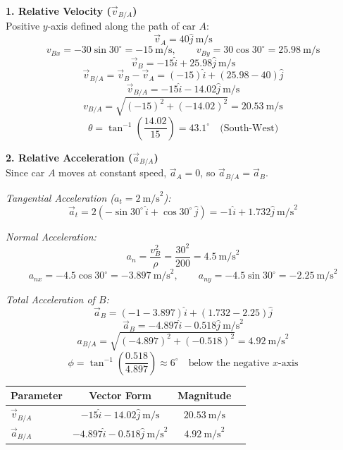 \documentclass[12pt,a3paper]{article}
\begin{document}
\begin{enumerate}
\begin{tcolorbox}[enhanced,breakable,ansbox,colback=cF!4,colframe=cF,
  boxrule=0.8pt,arc=5pt,
  title={\textbf{Solution}},fonttitle=\bfseries\color{white},
  colbacktitle=cF]

\textbf{1. Relative Velocity ($\vec{v}_{B/A}$)}\\[4pt]
Positive $y$-axis defined along the path of car $A$:
\[
  \vec{v}_A = 40\hat{j}\ \text{m/s}
\]
\[
  v_{Bx} = -30\sin30^\circ = -15\ \text{m/s}, \qquad
  v_{By} = 30\cos30^\circ = 25.98\ \text{m/s}
\]
\[
  \vec{v}_B = -15\hat{i} + 25.98\hat{j}\ \text{m/s}
\]
\[
  \vec{v}_{B/A} = \vec{v}_B - \vec{v}_A
               = (-15)\hat{i} + (25.98 - 40)\hat{j}
\]
\[
  \vec{v}_{B/A} = -15\hat{i} - 14.02\hat{j}\ \text{m/s}
\]
\[
  v_{B/A} = \sqrt{(-15)^2 + (-14.02)^2} = \boxed{20.53\ \text{m/s}}
\]
\[
  \theta = \tan^{-1}\!\left(\frac{14.02}{15}\right) = 43.1^\circ
  \quad \text{(South-West)}
\]

\medskip
\textbf{2. Relative Acceleration ($\vec{a}_{B/A}$)}\\[4pt]
Since car $A$ moves at constant speed, $\vec{a}_A = 0$, so
$\vec{a}_{B/A} = \vec{a}_B$.

\medskip
\textit{Tangential Acceleration ($a_t = 2\ \text{m/s}^2$):}
\[
  \vec{a}_t = 2(-\sin30^\circ\,\hat{i} + \cos30^\circ\,\hat{j})
            = -1\hat{i} + 1.732\hat{j}\ \text{m/s}^2
\]

\textit{Normal Acceleration:}
\[
  a_n = \frac{v_B^2}{\rho} = \frac{30^2}{200} = 4.5\ \text{m/s}^2
\]
\[
  a_{nx} = -4.5\cos30^\circ = -3.897\ \text{m/s}^2, \qquad
  a_{ny} = -4.5\sin30^\circ = -2.25\ \text{m/s}^2
\]

\textit{Total Acceleration of $B$:}
\[
  \vec{a}_B = (-1 - 3.897)\hat{i} + (1.732 - 2.25)\hat{j}
\]
\[
  \vec{a}_B = -4.897\hat{i} - 0.518\hat{j}\ \text{m/s}^2
\]
\[
  a_{B/A} = \sqrt{(-4.897)^2 + (-0.518)^2} = \boxed{4.92\ \text{m/s}^2}
\]
\[
  \phi = \tan^{-1}\!\left(\frac{0.518}{4.897}\right) \approx 6^\circ
  \quad \text{below the negative } x\text{-axis}
\]

\medskip
\begin{center}
\renewcommand{\arraystretch}{1.4}
\begin{tabular}{lccc}
  \hline
  \textbf{Parameter} & \textbf{Vector Form} & \textbf{Magnitude} \\
  \hline
  $\vec{v}_{B/A}$ &
  $-15\hat{i} - 14.02\hat{j}\ \text{m/s}$ &
  $20.53\ \text{m/s}$ \\
  $\vec{a}_{B/A}$ &
  $-4.897\hat{i} - 0.518\hat{j}\ \text{m/s}^2$ &
  $4.92\ \text{m/s}^2$ \\
  \hline
\end{tabular}
\end{center}


\end{tcolorbox}
\end{enumerate}
\end{document}
